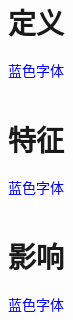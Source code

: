 
\section{定义}
\textcolor{blue}{蓝色字体}

\section{特征}
\textcolor{blue}{蓝色字体}


\section{影响}

\textcolor{blue}{蓝色字体}